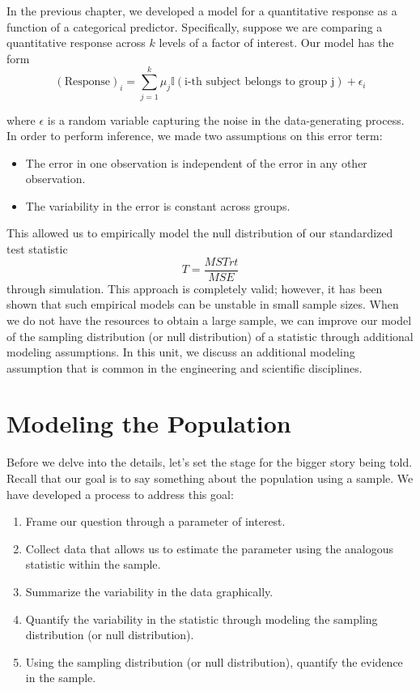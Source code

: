 \documentclass[]{book}
\providecommand{\tightlist}{%
  \setlength{\itemsep}{0pt}\setlength{\parskip}{0pt}}
\theoremstyle{definition}
\theoremstyle{definition}
\theoremstyle{remark}
\begin{document}
In the previous chapter, we developed a model for a quantitative
response as a function of a categorical predictor. Specifically, suppose
we are comparing a quantitative response across \(k\) levels of a factor
of interest. Our model has the form
\[(\text{Response})_i = \sum_{j=1}^{k} \mu_j \mathbb{I}\left(\text{i-th subject belongs to group j}\right) + \epsilon_i\]

where \(\epsilon\) is a random variable capturing the noise in the
data-generating process. In order to perform inference, we made two
assumptions on this error term:

\begin{itemize}
\tightlist
\item
  The error in one observation is independent of the error in any other
  observation.
\item
  The variability in the error is constant across groups.
\end{itemize}

This allowed us to empirically model the null distribution of our
standardized test statistic \[T = \frac{MSTrt}{MSE}\] through
simulation. This approach is completely valid; however, it has been
shown that such empirical models can be unstable in small sample sizes.
When we do not have the resources to obtain a large sample, we can
improve our model of the sampling distribution (or null distribution) of
a statistic through additional modeling assumptions. In this unit, we
discuss an additional modeling assumption that is common in the
engineering and scientific disciplines.

\section{Modeling the Population}\label{modeling-the-population}

Before we delve into the details, let's set the stage for the bigger
story being told. Recall that our goal is to say something about the
population using a sample. We have developed a process to address this
goal:

\begin{enumerate}
\def\labelenumi{\arabic{enumi}.}
\tightlist
\item
  Frame our question through a parameter of interest.
\item
  Collect data that allows us to estimate the parameter using the
  analogous statistic within the sample.
\item
  Summarize the variability in the data graphically.
\item
  Quantify the variability in the statistic through modeling the
  sampling distribution (or null distribution).
\item
  Using the sampling distribution (or null distribution), quantify the
  evidence in the sample.
\end{enumerate}
\end{document}
